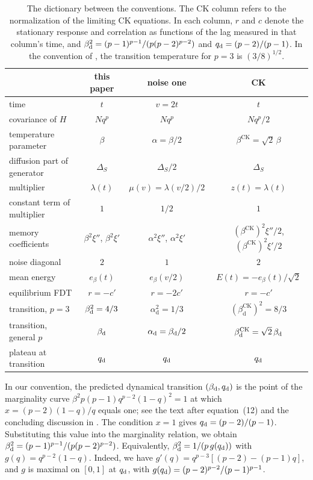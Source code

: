 \begin{table}[ht]
\centering
\small
\renewcommand{\arraystretch}{1.25}
\begin{tabular}{@{}lccc@{}}
\toprule
 & this paper & noise one \cite{dgm2007,sellke2024} & CK \cite{ck1993}\\
\midrule
time & $t$ & $v=2t$ & $t$\\
covariance of $H$ & $Nq^p$ & $Nq^p$ & $Nq^p/2$\\
temperature parameter & $\beta$ & $\alpha=\beta/2$ & $\beta^{\mathrm{CK}}=\sqrt2\,\beta$\\
diffusion part of generator & $\Delta_S$ & $\Delta_S/2$ & $\Delta_S$\\
multiplier & $\lambda(t)$ & $\mu(v)=\lambda(v/2)/2$ & $z(t)=\lambda(t)$\\
constant term of multiplier & $1$ & $1/2$ & $1$\\
memory coefficients & $\beta^2\xi''$, $\beta^2\xi'$ & $\alpha^2\xi''$, $\alpha^2\xi'$ & $(\beta^{\mathrm{CK}})^2\xi''/2$, $(\beta^{\mathrm{CK}})^2\xi'/2$\\
noise diagonal & $2$ & $1$ & $2$\\
mean energy & $e_\beta(t)$ & $e_\beta(v/2)$ & $E(t)=-e_\beta(t)/\sqrt2$\\
equilibrium FDT & $r=-c'$ & $r=-2c'$ & $r=-c'$\\
transition, $p=3$ & $\beta_{\mathrm d}^2=4/3$ & $\alpha_{\mathrm d}^2=1/3$ & $(\beta^{\mathrm{CK}}_{\mathrm d})^2=8/3$\\
transition, general $p$ & $\beta_{\mathrm d}$ & $\alpha_{\mathrm d}=\beta_{\mathrm d}/2$ & $\beta^{\mathrm{CK}}_{\mathrm d}=\sqrt2\,\beta_{\mathrm d}$\\
plateau at transition & $q_{\mathrm d}$ & $q_{\mathrm d}$ & $q_{\mathrm d}$\\
\bottomrule
\end{tabular}
\caption{The dictionary between the conventions. The CK column refers to the normalization of the limiting CK equations. In each column, $r$ and $c$ denote the stationary response and correlation as functions of the lag measured in that column's time, and $\beta_{\mathrm d}^2=(p-1)^{p-1}/(p(p-2)^{p-2})$ and $q_{\mathrm d}=(p-2)/(p-1)$. In the convention of \cite{ck1993}, the transition temperature for $p=3$ is $(3/8)^{1/2}$.}
\label{tab:conventions}
\end{table}

In our convention, the predicted dynamical transition $(\beta_{\mathrm d},q_{\mathrm d})$ is the point of the marginality curve $\beta^2p(p-1)q^{p-2}(1-q)^2=1$ at which $x=(p-2)(1-q)/q$ equals one; see the text after equation~(12) and the concluding discussion in \cite{ck1993}. The condition $x=1$ gives $q_{\mathrm d}=(p-2)/(p-1)$. Substituting this value into the marginality relation, we obtain $\beta_{\mathrm d}^2=(p-1)^{p-1}/(p(p-2)^{p-2})$. Equivalently, $\beta_{\mathrm d}^2=1/(p\,g(q_{\mathrm d}))$ with $g(q)=q^{p-2}(1-q)$. Indeed, we have $g'(q)=q^{p-3}[(p-2)-(p-1)q]$, and $g$ is maximal on $[0,1]$ at $q_{\mathrm d}$, with $g(q_{\mathrm d})=(p-2)^{p-2}/(p-1)^{p-1}$.

